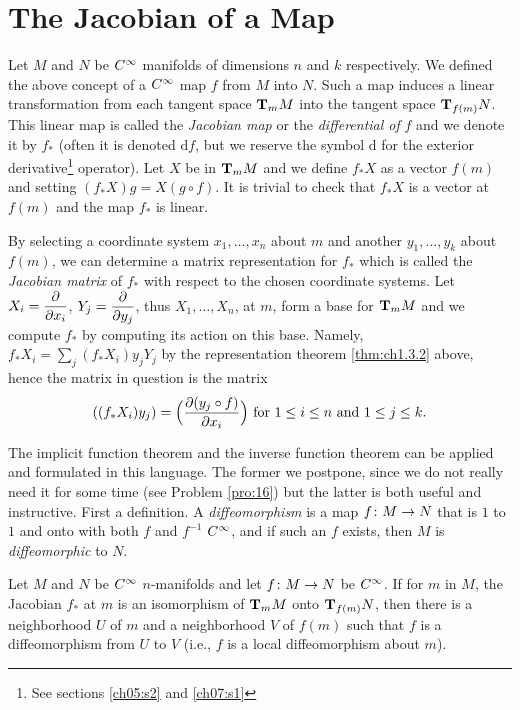 \documentclass[../main]{subfiles}
\begin{document}

\section{The Jacobian of a Map}\label{ch01:s4}
Let $M$ and $N$ be $\CInfty$ manifolds of dimensions $n$ and $k$ respectively. We defined the above concept of a $\CInfty$ map $f$ from $M$ into $N$. Such a map induces a linear transformation from each tangent space $\tangentspace{M}{m}$ into the tangent space $\tangentspace{N}{f(m)}$. This linear map is called the \emph{Jacobian map} or the \emph{differential of} $f$ and we denote it by $f_{*}$ (often it is denoted $\mathrm{d}f$, but we reserve the symbol $\mathrm{d}$ for the exterior derivative\footnote{See sections \ref{ch05:s2} and \ref{ch07:s1}} operator). Let $X$ be in $\tangentspace{M}{m}$ and we define $f_*X$ as a vector $f(m)$ and setting $(f_*X)g=X(g\circ f)$. It is trivial to check that $f_*X$ is a vector at $f(m)$ and the map $f_*$ is linear.

By selecting a coordinate system $x_1,\dots,x_n$ about $m$ and another $y_1,\dots,y_k$ about $f(m)$, we can determine a matrix representation for $f_*$ which is called the \emph{Jacobian matrix} of $f_*$ with respect to the chosen coordinate systems. Let $X_i=\pdv{}{x_i}$, $Y_j=\pdv{}{y_j}$, thus $X_1,\dots,X_n$, at $m$, form a base for $\tangentspace{M}{m}$ and we compute $f_*$ by computing its action on this base. Namely, $f_*X_i=\sum\limits_j(f_*X_i)y_jY_j$ by the representation theorem \ref{thm:ch1.3.2} above, hence the matrix in question is the matrix \[((f_*X_i)y_j)=\Big(\pdv{(y_j\circ f)}{x_i}\Big) \text{ for } 1\leq i\leq n \text{ and } 1\leq j\leq k.\]

The implicit function theorem and the inverse function theorem can be applied and formulated in this language. The former we postpone, since we do not really need it for some time (see Problem \ref{pro:16}) but the latter is both useful and instructive. First a definition. A \emph{diffeomorphism} is a map $f\colon M\functionMaps N$ that is $1$ to $1$ and onto with both $f$ and $f^{-1}$ $\CInfty$, and if such an $f$ exists, then $M$ is \emph{diffeomorphic} to $N$.

\begin{theorem}\label{thm:ch1.4.1}
Let $M$ and $N$ be $\CInfty$ $n$-manifolds and let $f\colon M\functionMaps N$ be $\CInfty$. If for $m$ in $M$, the Jacobian $f_*$ at $m$ is an isomorphism of $\tangentspace{M}{m}$ onto $\tangentspace{N}{f(m)}$, then there is a neighborhood $U$ of $m$ and a neighborhood $V$ of $f(m)$ such that $f$ is a diffeomorphism from $U$ to $V$ (i.e., $f$ is a local diffeomorphism about $m$).
\end{theorem}
\end{document}
